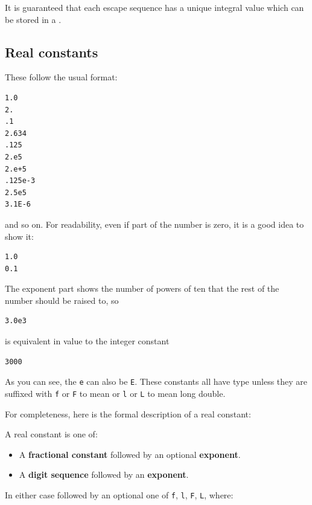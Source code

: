    It is guaranteed that each escape sequence has a unique integral value
    which can be stored in a \kchar.


  

  \subsection{Real constants}
   

   These follow the usual format:


   \begin{Verbatim}
1.0
2.
.1
2.634
.125
2.e5
2.e+5
.125e-3
2.5e5
3.1E-6
\end{Verbatim}

   and so on. For readability, even if part of the number is zero, it is a
    good idea to show it:


   \begin{Verbatim}
1.0
0.1
\end{Verbatim}

   The exponent part shows the number of powers of ten that the rest of the
    number should be raised to, so


   \begin{Verbatim}
3.0e3
\end{Verbatim}

   is equivalent in value to the integer constant


   \begin{Verbatim}
3000
\end{Verbatim}

   As you can see, the \texttt{e} can also be \texttt{E}.
    These constants all have type \double{} unless they are suffixed
    with \texttt{f} or \texttt{F} to mean \float{}
    or \texttt{l} or \texttt{L} to mean long double.


   For completeness, here is the formal description of a real constant:


   A real constant is one of:


   \begin{itemize}
    \item A \textbf{fractional constant} followed by an optional
     \textbf{exponent}.
    \item A \textbf{digit sequence} followed by an \textbf{exponent}.
   \end{itemize}

   In either case followed by an optional one of \texttt{f},
    \texttt{l}, \texttt{F}, \texttt{L}, where:


